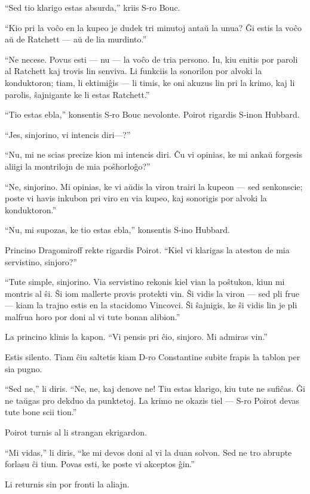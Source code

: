 ``Sed tio klarigo estas absurda,'' kriis S-ro Bouc.

``Kio pri la voĉo en la kupeo je dudek tri minutoj antaŭ la unua? Ĝi estis la voĉo aŭ de Ratchett --- aŭ de lia murdinto.''

``Ne necese. Povus esti --- nu --- la voĉo de tria persono. Iu, kiu enitis por paroli al Ratchett kaj trovis lin senviva. Li funkciis la sonorilon por alvoki la konduktoron; tiam, li ektimiĝis --- li timis, ke oni akuzus lin pri la krimo, kaj li parolis, ŝajnigante ke li estas Ratchett.''

``Tio estas ebla,'' konsentis S-ro Bouc nevolonte. Poirot rigardis S-inon Hubbard.

``Jes, sinjorino, vi intencis diri---?''

``Nu, mi ne scias precize kion mi intencis diri. Ĉu vi opinias, ke mi ankaŭ forgesis aliigi la montrilojn de mia poŝhorloĝo?''

``Ne, sinjorino. Mi opinias, ke vi aŭdis la viron trairi la kupeon --- sed senkonscie; poste vi havis inkubon pri viro en via kupeo, kaj sonorigis por alvoki la konduktoron.''

``Nu, mi supozas, ke tio estas ebla,'' konsentis S-ino Hubbard.

Princino Dragomiroff rekte rigardis Poirot. ``Kiel vi klarigas la ateston de mia servistino, sinjoro?''

``Tute simple, sinjorino. Via servistino rekonis kiel vian la poŝtukon, kiun mi montris al ŝi. Ŝi iom mallerte provis protekti vin. Ŝi vidis la viron --- sed pli frue --- kiam la trajno estis en la stacidomo Vincovci. Ŝi ŝajnigis, ke ŝi vidis lin je pli malfrua horo por doni al vi tute bonan alibion.''

La princino klinis la kapon. ``Vi pensis pri ĉio, sinjoro. Mi admiras vin.''

Estis silento. Tiam ĉiu saltetis kiam D-ro Constantine subite frapis la tablon per sia pugno.

``Sed ne,'' li diris. ``Ne, ne, kaj denove ne! Tiu estas klarigo, kiu tute ne sufiĉas. Ĝi ne taŭgas pro dekduo da punktetoj. La krimo ne okazis tiel --- S-ro Poirot devas tute bone scii tion.''

Poirot turnis al li strangan ekrigardon.

``Mi vidas,'' li diris, ``ke mi devos doni al vi la duan solvon. Sed ne tro abrupte forlasu ĉi tiun. Povas esti, ke poste vi akceptos ĝin.''

Li returnis sin por fronti la aliajn.

